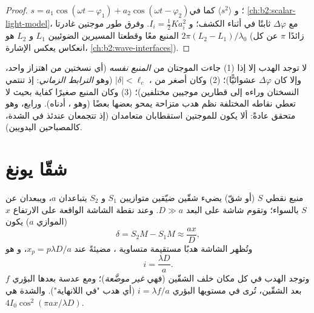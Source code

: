 \begin{proof}
$s = a_1\cos(\omega t - \varphi_1) + a_2\cos(\omega t - \varphi_2)$؛ و $\langle s^2\rangle$ كما في
\cref{ch:b2:scalar-light-model}، مع $\Delta\varphi$ ثابتًا في أثناء
الكشف؛ و $I_i = \tfrac12Ka_i^2$. وفرق طور موجتين
غادرتا المنبع معًا وقطعتا المسيرين الضوئيين $L_1$ و $L_2$ هو
$2\pi(L_2 - L_1)/\lambda_0$ (زائدًا $\pi$ عن كل انعكاس يعكس
الإشارة، \cref{ch:b2:wave-interfaces}).
\end{proof}

\begin{remark}\label{rem:b2:two-wave-interference:conditions}
لا توجد الهدب إلا إذا (1) جاءت الموجتان من \emph{المنبع
نفسه} (أي نسختين من اهتزاز واحد، وإلا كان $\Delta\varphi$ عشوائيًّا)؛ (2)
وكان  أصغر من ، $|\delta| < \ell_c$
(وهو \emph{الترابط الزماني}: إذ تنتمي النسختان وراءه إلى قطارين
موجيين مختلفين)؛ (3) وكان المنبع صغيرًا كفاية بحيث لا تعطي نقاطه
المختلفة نظم هدب متزاحة يمحو بعضها بعضًا
(وهو \emph{}، أدناه). ورابع، وهو متحقق عادةً:
ألا يكون للموجتين استقطابان متعامدان (إذ تتجمعان
عندئذ في الشدة، كالمصباحين اليدويين).
\end{remark}

\section{شقّا يونغ}

\begin{proposition}\label{prop:b2:two-wave-interference:young}
منبع نقطي $S$ (أو شقّ) يضيء شقّين ضيّقين متوازيين
$S_1$ و $S_2$ يتباعدان $a$، ويبعدان عن $S$ بالسواء؛ وتقوم شاشة على
البعد $D \gg a$. وعند نقطة الشاشة الواقعة على الارتفاع $x$ (الموازي
 $a$) يكون 
\[
\delta = S_2M - S_1M \approx \frac{ax}D ,
\]
وتُظهر الشاشة هدبًا مستقيمة متساوية ، مضيئةً عند $x_p =
p\lambda D/a$، و\emph{} هو
\[
i = \frac{\lambda D}a .
\]
وتوجد الهدب في كل مكان خلف الشقّين (فهي \emph{غير
موضَّعة})؛ ومع عدسة بعدها البؤري $f$ بعد الشقّين، تُرى
في مستويها البؤري  $i = \lambda f/a$ (أي هدب "في اللانهاية").
والشدة هي $4I_0\cos^2(\pi ax/\lambda D)$.
\end{proposition}

